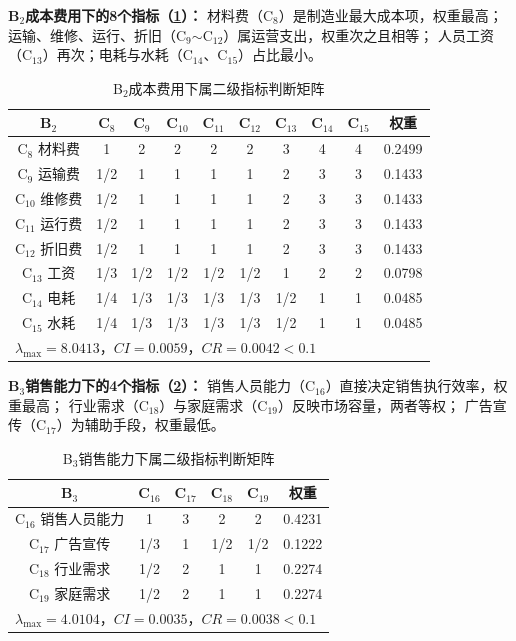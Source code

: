 \documentclass[a4paper,12pt]{ctexart}
\begin{document}
\textbf{B$_2$成本费用下的8个指标（\cref{tab:b2c}）：}
材料费（C$_8$）是制造业最大成本项，权重最高；
运输、维修、运行、折旧（C$_9$$\sim$C$_{12}$）属运营支出，权重次之且相等；
人员工资（C$_{13}$）再次；电耗与水耗（C$_{14}$、C$_{15}$）占比最小。

\begin{table}[H]
\centering
\caption{B$_2$成本费用下属二级指标判断矩阵}
\label{tab:b2c}
\small
\begin{tabular}{c|cccccccc|c}
\toprule
B$_2$ & C$_8$ & C$_9$ & C$_{10}$ & C$_{11}$ & C$_{12}$ & C$_{13}$ & C$_{14}$ & C$_{15}$ & 权重 \\
\midrule
C$_8$ 材料费       & 1   & 2   & 2   & 2   & 2   & 3   & 4   & 4   & 0.2499 \\
C$_9$ 运输费       & 1/2 & 1   & 1   & 1   & 1   & 2   & 3   & 3   & 0.1433 \\
C$_{10}$ 维修费    & 1/2 & 1   & 1   & 1   & 1   & 2   & 3   & 3   & 0.1433 \\
C$_{11}$ 运行费    & 1/2 & 1   & 1   & 1   & 1   & 2   & 3   & 3   & 0.1433 \\
C$_{12}$ 折旧费    & 1/2 & 1   & 1   & 1   & 1   & 2   & 3   & 3   & 0.1433 \\
C$_{13}$ 工资      & 1/3 & 1/2 & 1/2 & 1/2 & 1/2 & 1   & 2   & 2   & 0.0798 \\
C$_{14}$ 电耗      & 1/4 & 1/3 & 1/3 & 1/3 & 1/3 & 1/2 & 1   & 1   & 0.0485 \\
C$_{15}$ 水耗      & 1/4 & 1/3 & 1/3 & 1/3 & 1/3 & 1/2 & 1   & 1   & 0.0485 \\
\bottomrule
\multicolumn{10}{l}{$\lambda_{\max}=8.0413$，$CI=0.0059$，$CR=0.0042<0.1$} \\
\end{tabular}
\end{table}

\textbf{B$_3$销售能力下的4个指标（\cref{tab:b3c}）：}
销售人员能力（C$_{16}$）直接决定销售执行效率，权重最高；
行业需求（C$_{18}$）与家庭需求（C$_{19}$）反映市场容量，两者等权；
广告宣传（C$_{17}$）为辅助手段，权重最低。

\begin{table}[H]
\centering
\caption{B$_3$销售能力下属二级指标判断矩阵}
\label{tab:b3c}
\begin{tabular}{c|cccc|c}
\toprule
B$_3$ & C$_{16}$ & C$_{17}$ & C$_{18}$ & C$_{19}$ & 权重 \\
\midrule
C$_{16}$ 销售人员能力 & 1   & 3   & 2   & 2   & 0.4231 \\
C$_{17}$ 广告宣传     & 1/3 & 1   & 1/2 & 1/2 & 0.1222 \\
C$_{18}$ 行业需求     & 1/2 & 2   & 1   & 1   & 0.2274 \\
C$_{19}$ 家庭需求     & 1/2 & 2   & 1   & 1   & 0.2274 \\
\bottomrule
\multicolumn{6}{l}{$\lambda_{\max}=4.0104$，$CI=0.0035$，$CR=0.0038<0.1$} \\
\end{tabular}
\end{table}
\end{document}
